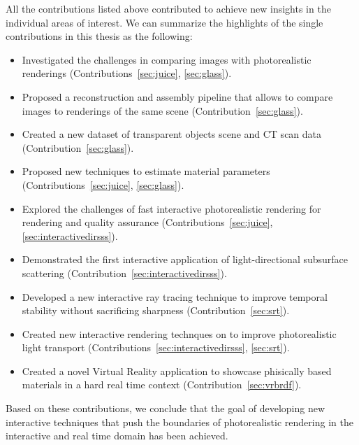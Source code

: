 All the contributions listed above contributed to achieve new insights in the individual areas of interest. We can summarize the highlights of the single contributions in this thesis as the following: 
\label{sec:conclusion}
\begin{itemize}
\item Investigated the challenges in comparing images with photorealistic renderings (Contributions~\ref{sec:juice}, \ref{sec:glass}).
\item Proposed a reconstruction and assembly pipeline that allows to compare images to renderings of the same scene (Contribution~\ref{sec:glass}).
\item Created a new dataset of transparent objects scene and CT scan data (Contribution~\ref{sec:glass}).
\item Proposed new techniques to estimate material parameters (Contributions~\ref{sec:juice}, \ref{sec:glass}).
\item Explored the challenges of fast interactive photorealistic rendering for rendering and quality assurance (Contributions~\ref{sec:juice},\ref{sec:interactivedirsss}).
\item Demonstrated the first interactive application of light-directional subsurface scattering (Contribution~\ref{sec:interactivedirsss}).
\item Developed a new interactive ray tracing technique to improve temporal stability without sacrificing sharpness (Contribution~\ref{sec:srt}).
\item Created new interactive rendering technques on to improve photorealistic light transport (Contributions~\ref{sec:interactivedirsss}, \ref{sec:srt}).
\item Created a novel Virtual Reality application to showcase phisically based materials in a hard real time context (Contribution~\ref{sec:vrbrdf}).
\end{itemize}

Based on these contributions, we conclude that the goal of developing new interactive techniques that push the boundaries of photorealistic rendering in the interactive and real time domain has been achieved. 